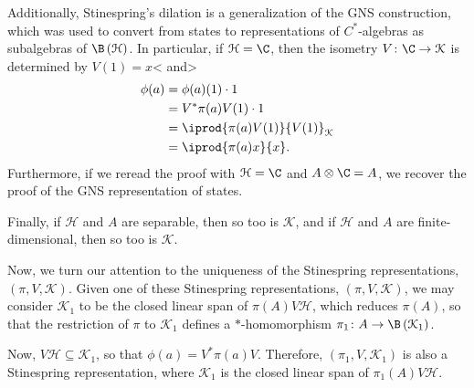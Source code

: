 \documentclass[10pt]{mypackage}
\begin{document}
Additionally, Stinespring's dilation is a generalization of the GNS construction, which was used to convert from states to representations of $C^{\ast}$-algebras as subalgebras of $\B\left( \mathcal{H} \right)$. In particular, if $\mathcal{H} = \C$, then the isometry $V\colon \C\rightarrow \mathcal{K}$ is determined by $V(1) = x$< and>
\begin{align*}
  \phi(a) &= \phi(a)(1)\cdot 1\\
          &= V^{\ast}\pi(a)V(1)\cdot 1\\
          &= \iprod{\pi(a)V(1)}{V(1)}_{\mathcal{K}}\\
          &= \iprod{\pi(a)x}{x}.
\end{align*}
Furthermore, if we reread the proof with $\mathcal{H}= \C$  and $A\otimes \C = A$, we recover the proof of the GNS representation of states.\newline

Finally, if $\mathcal{H}$ and $A$ are separable, then so too is $\mathcal{K}$, and if $\mathcal{H}$ and $A$ are finite-dimensional, then so too is $\mathcal{K}$.\newline

Now, we turn our attention to the uniqueness of the Stinespring representations, $\left( \pi,V,\mathcal{K} \right)$. Given one of these Stinespring representations, $\left( \pi,V,\mathcal{K} \right)$, we may consider $\mathcal{K}_1$ to be the closed linear span of $\pi(A)V\mathcal{H}$, which reduces $\pi(A)$, so that the restriction of $\pi$ to $\mathcal{K}_1$ defines a $\ast$-homomorphism $\pi_1\colon A\rightarrow \B\left( \mathcal{K}_1 \right)$.\newline

Now, $V\mathcal{H}\subseteq \mathcal{K}_1$, so that $\phi(a)=V^{\ast}\pi(a)V$. Therefore, $\left( \pi_1,V,\mathcal{K}_1 \right)$ is also a Stinespring representation, where $\mathcal{K}_1$ is the closed linear span of $\pi_1(A)V\mathcal{H}$.\newline
\end{document}
